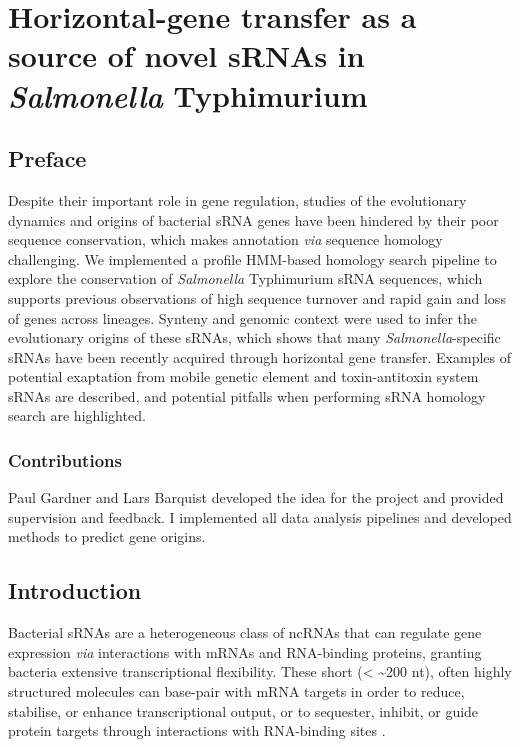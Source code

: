 \chapter{Horizontal-gene transfer as a source of novel sRNAs in \textit{Salmonella} Typhimurium}
\label{chap:sal_sRNA}
\section{Preface}

Despite their important role in gene regulation, studies of the evolutionary dynamics and origins of bacterial sRNA genes have been hindered by their poor sequence conservation, which makes annotation \textit{via} sequence homology challenging. We implemented a profile HMM-based homology search pipeline to explore the conservation of \textit{Salmonella} Typhimurium sRNA sequences, which supports previous observations of high sequence turnover and rapid gain and loss of genes across lineages. Synteny and genomic context were used to infer the evolutionary origins of these sRNAs, which shows that many \textit{Salmonella}-specific sRNAs have been recently acquired through horizontal gene transfer. Examples of potential exaptation from mobile genetic element and toxin-antitoxin system sRNAs are described, and potential pitfalls when performing sRNA homology search are highlighted.

\subsection{Contributions}
Paul Gardner and Lars Barquist developed the idea for the project and provided supervision and feedback. I implemented all data analysis pipelines and developed methods to predict gene origins.

\newpage
\section{Introduction}

Bacterial sRNAs are a heterogeneous class of ncRNAs that can regulate gene expression \textit{via} interactions with mRNAs and RNA-binding proteins, granting bacteria extensive transcriptional flexibility. These short (< \textasciitilde200 nt), often highly structured molecules can base-pair with mRNA targets in order to reduce, stabilise, or enhance transcriptional output, or to sequester, inhibit, or guide protein targets through interactions with RNA-binding sites \citep{Storz2011-tb,Barquist2015-pa}.


